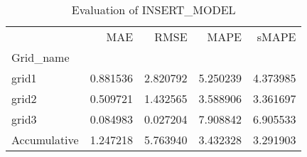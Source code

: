 \begin{table}
\centering
\caption{Evaluation of INSERT_MODEL}
\begin{tabular}{lrrrr}
\toprule
{} &       MAE &      RMSE &      MAPE &     sMAPE \\
Grid\_name    &           &           &           &           \\
\midrule
grid1        &  0.881536 &  2.820792 &  5.250239 &  4.373985 \\
grid2        &  0.509721 &  1.432565 &  3.588906 &  3.361697 \\
grid3        &  0.084983 &  0.027204 &  7.908842 &  6.905533 \\
Accumulative &  1.247218 &  5.763940 &  3.432328 &  3.291903 \\
\bottomrule
\end{tabular}
\end{table}
